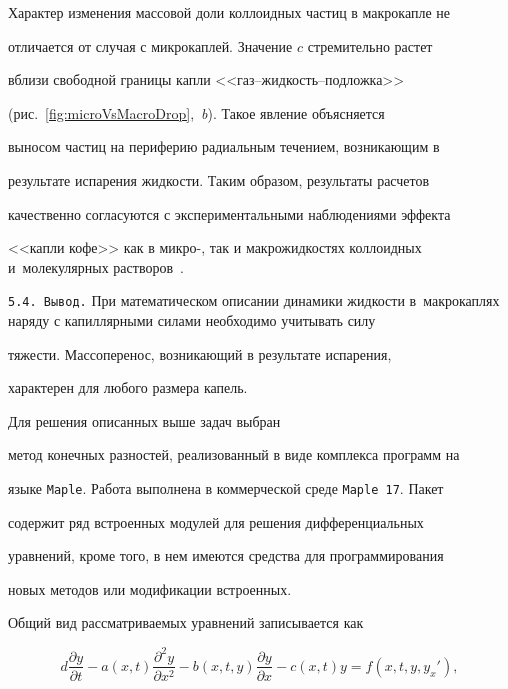 Характер изменения массовой доли коллоидных частиц в макрокапле не

отличается от случая с микрокаплей. Значение $c$ стремительно растет

вблизи свободной границы капли <<газ–жидкость–подложка>>

(рис.~\ref{fig:microVsMacroDrop},~{\sl b}). Такое явление объясняется

выносом частиц на периферию радиальным течением, возникающим в

результате испарения жидкости. Таким образом, результаты расчетов

качественно согласуются с экспериментальными наблюдениями эффекта

<<капли кофе>> как в микро-, так и макрожидкостях коллоидных и~молекулярных растворов~\cite{Deegan2000,Leng2010}.



\smallskip



\texttt{5.4. Вывод.} При математическом описании динамики жидкости в~макрокаплях наряду с капиллярными силами необходимо учитывать силу

тяжести. Массоперенос, возникающий в результате испарения,

характерен для любого размера капель.



\hypertarget{kol:6}{}



 Для решения описанных выше задач выбран

метод конечных разностей, реализованный в виде комплекса программ на

языке {\tt Maple}. Работа выполнена в коммерческой среде {\tt Maple~17}. Пакет

содержит ряд встроенных модулей для решения дифференциальных

уравнений, кроме того, в нем имеются средства для программирования

новых методов или модификации встроенных.



Общий вид рассматриваемых уравнений записывается как

\begin{equation}\label{eq:commonParabolicPDE}

d\frac{\partial y}{\partial t}-a(x,t)\frac{\partial^2 y}{\partial

x^2}-b(x,t,y)\frac{\partial y}{\partial x}-c(x,t)y=f(x,t,y,y_x'),

\end{equation}

